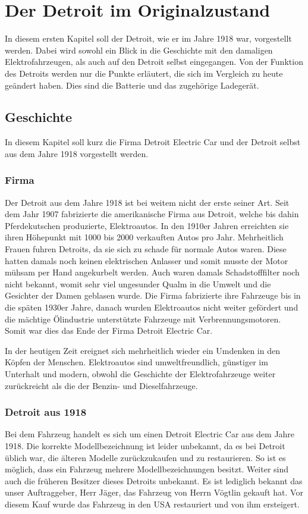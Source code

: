 \chapter{Der Detroit im Originalzustand}
In diesem ersten Kapitel soll der Detroit, wie er im Jahre 1918 war, vorgestellt werden. Dabei wird sowohl ein Blick in die Geschichte mit den damaligen Elektrofahrzeugen, als auch auf den Detroit selbst eingegangen. Von der Funktion des Detroits werden nur die Punkte erläutert, die sich im Vergleich zu heute geändert haben. Dies sind die Batterie und das zugehörige Ladegerät.

\section{Geschichte}

In diesem Kapitel soll kurz die Firma Detroit Electric Car und der Detroit selbst aus dem Jahre 1918 vorgestellt werden.

\subsection{Firma}

Der Detroit aus dem Jahre 1918 ist bei weitem nicht der erste seiner Art. Seit dem Jahr 1907 fabrizierte die amerikanische Firma aus Detroit, welche bis dahin Pferdekutschen produzierte, Elektroautos. In den 1910er Jahren erreichten sie ihren Höhepunkt mit 1000 bis 2000 verkauften Autos pro Jahr. Mehrheitlich Frauen fuhren Detroits, da sie sich zu schade für normale Autos waren. Diese hatten damals noch keinen elektrischen Anlasser und somit musste der Motor mühsam per Hand angekurbelt werden. Auch waren damals Schadstofffilter noch nicht bekannt, womit sehr viel ungesunder Qualm in die Umwelt und die Gesichter der Damen geblasen wurde. Die Firma fabrizierte ihre Fahrzeuge bis in die späten 1930er Jahre, danach wurden Elektroautos nicht weiter gefördert und die mächtige Ölindustrie unterstützte Fahrzeuge mit Verbrennungsmotoren. Somit war dies das Ende der Firma Detroit Electric Car.

In der heutigen Zeit ereignet sich mehrheitlich wieder ein Umdenken in den Köpfen der Menschen. Elektroautos sind umweltfreundlich, günstiger im Unterhalt und modern, obwohl die Geschichte der Elektrofahrzeuge weiter zurückreicht als die der Benzin- und Dieselfahrzeuge.

\subsection{Detroit aus 1918}

Bei dem Fahrzeug handelt es sich um einen Detroit Electric Car aus dem Jahre 1918. Die korrekte Modellbezeichnung ist leider unbekannt, da es bei Detroit üblich war, die älteren Modelle zurückzukaufen und zu restaurieren. So ist es möglich, dass ein Fahrzeug mehrere Modellbezeichnungen besitzt. Weiter sind auch die früheren Besitzer dieses Detroits unbekannt. Es ist lediglich bekannt das unser Auftraggeber, Herr Jäger, das Fahrzeug von Herrn Vögtlin gekauft hat. Vor diesem Kauf wurde das Fahrzeug in den USA restauriert und von ihm ersteigert.

\newpage